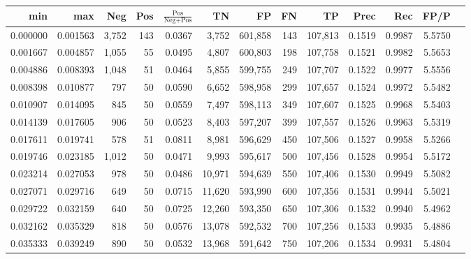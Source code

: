 \begin{tabular}{rrrrrrrrrrrrr}
\toprule
     min &      max &   Neg & Pos & $\frac{\text{Pos}}{\text{Neg}+\text{Pos}}$ &      TN &      FP &      FN &      TP &   Prec &    Rec &   FP/P \\
\midrule
0.000000 & 0.001563 & 3,752 & 143 &                                     0.0367 &   3,752 & 601,858 &     143 & 107,813 & 0.1519 & 0.9987 & 5.5750 \\
0.001667 & 0.004857 & 1,055 &  55 &                                     0.0495 &   4,807 & 600,803 &     198 & 107,758 & 0.1521 & 0.9982 & 5.5653 \\
0.004886 & 0.008393 & 1,048 &  51 &                                     0.0464 &   5,855 & 599,755 &     249 & 107,707 & 0.1522 & 0.9977 & 5.5556 \\
0.008398 & 0.010877 &   797 &  50 &                                     0.0590 &   6,652 & 598,958 &     299 & 107,657 & 0.1524 & 0.9972 & 5.5482 \\
0.010907 & 0.014095 &   845 &  50 &                                     0.0559 &   7,497 & 598,113 &     349 & 107,607 & 0.1525 & 0.9968 & 5.5403 \\
0.014139 & 0.017605 &   906 &  50 &                                     0.0523 &   8,403 & 597,207 &     399 & 107,557 & 0.1526 & 0.9963 & 5.5319 \\
0.017611 & 0.019741 &   578 &  51 &                                     0.0811 &   8,981 & 596,629 &     450 & 107,506 & 0.1527 & 0.9958 & 5.5266 \\
0.019746 & 0.023185 & 1,012 &  50 &                                     0.0471 &   9,993 & 595,617 &     500 & 107,456 & 0.1528 & 0.9954 & 5.5172 \\
0.023214 & 0.027053 &   978 &  50 &                                     0.0486 &  10,971 & 594,639 &     550 & 107,406 & 0.1530 & 0.9949 & 5.5082 \\
0.027071 & 0.029716 &   649 &  50 &                                     0.0715 &  11,620 & 593,990 &     600 & 107,356 & 0.1531 & 0.9944 & 5.5021 \\
0.029722 & 0.032159 &   640 &  50 &                                     0.0725 &  12,260 & 593,350 &     650 & 107,306 & 0.1532 & 0.9940 & 5.4962 \\
0.032162 & 0.035329 &   818 &  50 &                                     0.0576 &  13,078 & 592,532 &     700 & 107,256 & 0.1533 & 0.9935 & 5.4886 \\
0.035333 & 0.039249 &   890 &  50 &                                     0.0532 &  13,968 & 591,642 &     750 & 107,206 & 0.1534 & 0.9931 & 5.4804 \\

\end{tabular}
